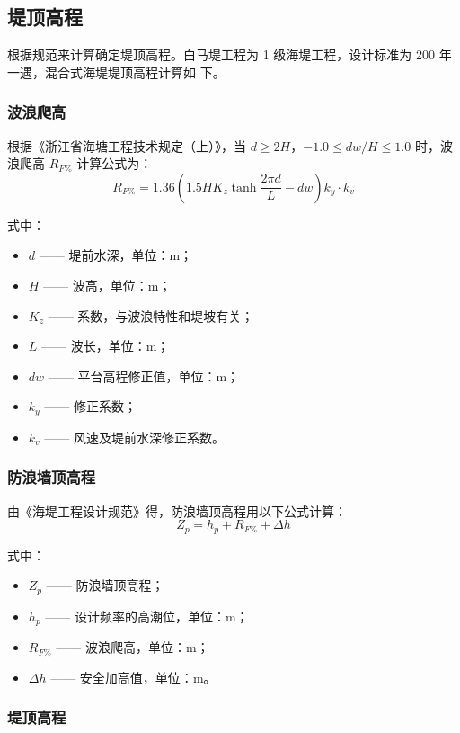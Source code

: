 \documentclass[UTF8, a4paper, 12pt]{ctexart} %
\begin{document}
\newpage
\subsection{堤顶高程}
根据规范来计算确定堤顶高程。白马堤工程为 1 级海堤工程，设计标准为 200 年一遇，混合式海堤堤顶高程计算如
下。

\subsubsection{波浪爬高}
根据《浙江省海塘工程技术规定（上）》，当 $d \geq 2H$，$-1.0 \leq dw/H \leq 1.0$ 时，波浪爬高 $R_{F\%}$ 计算公式为：
\begin{equation}
    R_{F\%} = 1.36 \left( 1.5 H K_z \tanh \frac{2 \pi d}{L} - dw \right) k_y \cdot k_v
\end{equation}

式中：
\begin{itemize}
    \item $d$ —— 堤前水深，单位：$\text{m}$；
    \item $H$ —— 波高，单位：$\text{m}$；
    \item $K_z$ —— 系数，与波浪特性和堤坡有关；
    \item $L$ —— 波长，单位：$\text{m}$；
    \item $dw$ —— 平台高程修正值，单位：$\text{m}$；
    \item $k_y$ —— 修正系数；
    \item $k_v$ —— 风速及堤前水深修正系数。
\end{itemize}

\subsubsection{防浪墙顶高程}
由《海堤工程设计规范》得，防浪墙顶高程用以下公式计算：
\begin{equation}
    Z_p = h_p + R_{F\%} + \Delta h
\end{equation}

式中：
\begin{itemize}
    \item $Z_p$ —— 防浪墙顶高程；
    \item $h_p$ —— 设计频率的高潮位，单位：$\text{m}$；
    \item $R_{F\%}$ —— 波浪爬高，单位：$\text{m}$；
    \item $\Delta h$ —— 安全加高值，单位：$\text{m}$。
\end{itemize}

\subsubsection{堤顶高程}
\end{document}

